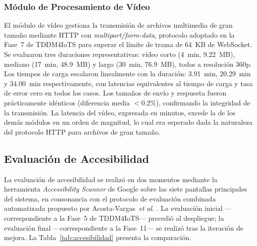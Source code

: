 \documentclass[journal]{IEEEtran}
\begin{document}
			\subsubsection{M\'odulo de Procesamiento de V\'ideo}
				El m\'odulo de v\'ideo gestiona la transmisi\'on de archivos multimedia de gran tama\~no mediante HTTP con \textit{multipart/form-data}, protocolo adoptado en la Fase~7 de TDDM4IoTS para superar el l\'imite de trama de 64~KB de WebSocket. Se evaluaron tres duraciones representativas: v\'ideo corto (4~min, 9.22~MB), mediano (17~min, 48.9~MB) y largo (30~min, 76.9~MB), todos a resoluci\'on 360p. Los tiempos de carga escalaron linealmente con la duraci\'on: 3.91~min, 20.29~min y 34.00~min respectivamente, con latencias equivalentes al tiempo de carga y tasa de error cero en todos los casos. Los tama\~nos de env\'io y respuesta fueron pr\'acticamente id\'enticos (diferencia media $< 0.2\%$), confirmando la integridad de la transmisi\'on. La latencia del v\'ideo, expresada en minutos, excede la de los dem\'as m\'odulos en un orden de magnitud, lo cual era esperado dada la naturaleza del protocolo HTTP para archivos de gran tama\~no.
				
		\subsection{Evaluaci\'on de Accesibilidad}
			La evaluaci\'on de accesibilidad se realiz\'o en dos momentos mediante la herramienta \textit{Accessibility Scanner} de Google \cite{acosta2021} sobre las siete pantallas principales del sistema, en consonancia con el protocolo de evaluaci\'on combinada automatizada propuesto por Acosta-Vargas~\textit{et al.} \cite{acosta2021}. La evaluaci\'on inicial ---correspondiente a la Fase~5 de TDDM4IoTS--- precedi\'o al despliegue; la evaluaci\'on final ---correspondiente a la Fase~11--- se realiz\'o tras la iteraci\'on de mejora. La Tabla~\ref{tab:accesibilidad} presenta la comparaci\'on.
			
\end{document}
